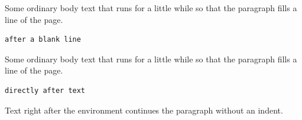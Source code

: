 \documentclass{article}
\begin{document}
Some ordinary body text that runs for a little while so that the paragraph fills a line of the page.

\begin{verbatim}
after a blank line
\end{verbatim}

Some ordinary body text that runs for a little while so that the paragraph fills a line of the page.
\begin{verbatim}
directly after text
\end{verbatim}
Text right after the environment continues the paragraph without an indent.
\end{document}
